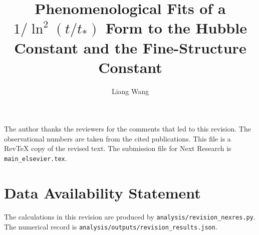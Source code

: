 \documentclass[aps,prd,twocolumn,superscriptaddress,nofootinbib,floatfix]{revtex4-2}
\begin{document}
\title{Phenomenological Fits of a $1/\ln^{2}(t/t_{*})$ Form to the Hubble Constant and the Fine-Structure Constant}

\author{Liang Wang}



\maketitle









\begin{acknowledgments}
The author thanks the reviewers for the comments that led to this revision.
The observational numbers are taken from the cited publications.
This file is a Rev\TeX{} copy of the revised text.
The submission file for Next Research is \texttt{main\_elsevier.tex}.
\end{acknowledgments}

\section*{Data Availability Statement}
The calculations in this revision are produced by \texttt{analysis/revision\_nexres.py}.
The numerical record is \texttt{analysis/outputs/revision\_results.json}.


\end{document}
